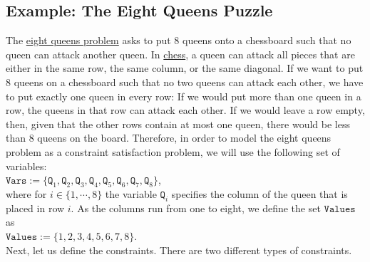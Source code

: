 \subsection{Example: The Eight Queens Puzzle}
The \href{https://en.wikipedia.org/wiki/Eight_queens_puzzle}{eight queens problem} asks to put 8 queens onto a
chessboard such that no queen can attack another queen.  In \href{https://en.wikipedia.org/wiki/Chess}{chess},
a queen can attack all pieces that are either in the same row, the same column, or the same diagonal.  If we
want to put 8 queens on a chessboard such that no two queens can attack each other, we have to put exactly one
queen in every row:  If we would put more than one queen in a row, the queens in that row can attack each other.
If we would leave a row empty, then, given that the other rows contain at most one queen, there would be less
than 8 queens on the board.  Therefore, in order to model the eight queens problem as a constraint satisfaction
problem, we will use the following set of variables:
\\[0.2cm]
\hspace*{1.3cm}
$\texttt{Vars} := \{ \texttt{Q}_1, \texttt{Q}_2, \texttt{Q}_3, \texttt{Q}_4, \texttt{Q}_5, \texttt{Q}_6, \texttt{Q}_7,\texttt{Q}_8 \}$,
\\[0.2cm]
where for $i \in \{1,\cdots,8\}$ the variable $\texttt{Q}_i$ specifies the column of the queen that is placed in
row $i$.   As the columns run from one to eight, we define the set $\texttt{Values}$ as
\\[0.2cm]
\hspace*{1.3cm}
$\texttt{Values} := \{1,2,3,4,5,6,7,8\}$.
\\[0.2cm]
Next, let us define the constraints.  There are two different types of constraints.

